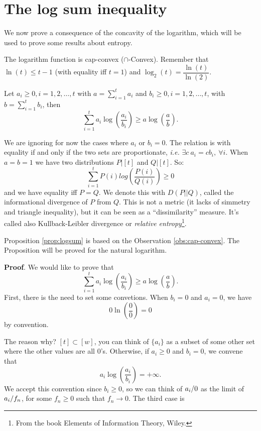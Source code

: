 \chapter{The log sum inequality}
We now prove a consequence of the concavity of the logarithm, which will be used to prove some results about entropy.

\begin{obs}\label{obs:cap-convex}
	The logarithm function is cap-convex ($\cap$-Convex). Remember that $\ln(t) \leq t - 1$ (with equality iff $t=1$) and $\log_2(t) = \dfrac{\ln(t)}{\ln(2)}$.
	
\end{obs}

\begin{prop}\label{prop:logsum}
	Let $a_i \geq 0, i = 1, 2, \ldots, t$ with $a = \sum_{i = 1}^t a_i$ and $b_i \geq 0, i = 1, 2, \ldots, t$, with $b = \sum_{i = 1}^t b_i$, then $$\sum_{i= 1}^ta_i\log\left(\dfrac{a_i}{b_i}\right)\geq a\log\left(\dfrac{a}{b}\right).$$
\end{prop}

We are ignoring for now the cases where $a_i$ or $b_i = 0$. The relation is with equality if and only if  the two sets are proportionate, \emph{i.e.} $\exists c\ a_i = cb_i,\ \forall i$. When $a = b = 1$ we have two distributions $P|[t]$ and $Q|[t]$. So:
\[
\sum_{i = 1}^tP(i)log\left(\dfrac{P(i)}{Q(i)}\right)\geq 0
 \]
 and we have equality iff $P = Q$. We denote this with $D(P||Q)$, called the informational divergence of $P$ from $Q$. This is not a metric (it lacks of simmetry and triangle inequality), but it can be seen as a ``dissimilarity'' measure. It's called also Kullback-Leibler divergence or \emph{relative entropy}\footnote{From the book Elements of Information Theory, Wiley.}. 
 
 Proposition \ref{prop:logsum} is based on the Observation \ref{obs:cap-convex}. The Proposition will be proved for the natural logarithm.
 
 \noindent\textbf{Proof}. We would like to prove that $$\sum_{i= 1}^ta_i\log\left(\dfrac{a_i}{b_i}\right)\geq a\log\left(\dfrac{a}{b}\right).$$First, there is the need to set some convetions. When $b_i = 0$ and $a_i = 0$, we have $$0\ln(\dfrac{0}{0}) = 0$$ by convention.
 
 The reason why? $[t] \subset [w]$, you can think of $\{a_i\}$ as a subset of some other set where the other values are all $0$'s. Otherwise, if $a_i \geq 0$ and $b_i = 0$, we convene that $$a_i\log\left(\dfrac{a_i}{b_i}\right) = +\infty.$$ We accept this convention since $b_i \geq 0$, so we can think of ${a_i}/{0}$ as the limit of ${a_i}/{f_n}$, for some $f_n\geq 0$ such that $f_n \rightarrow 0$. The third case is
 
